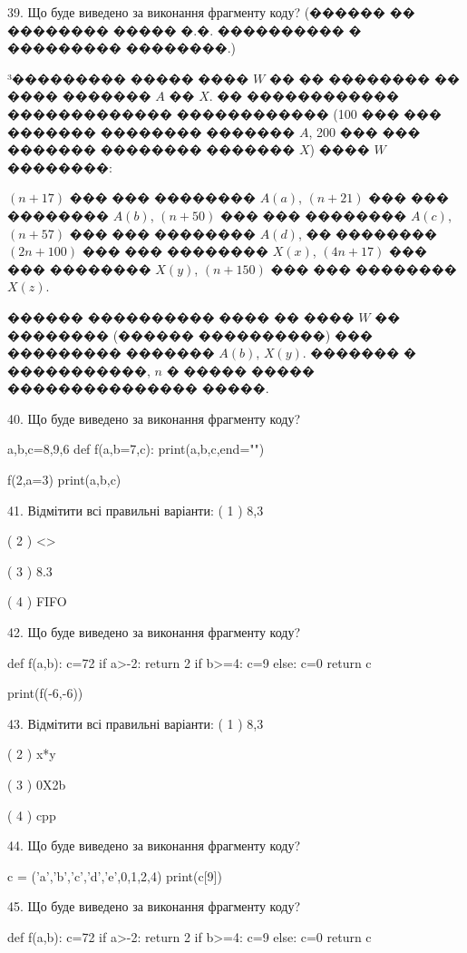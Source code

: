 \documentclass[11pt]{article}
\begin{document}

39. Що буде виведено за виконання фрагменту коду?
(������ �� �������� ����� �.�. ���������� � ��������� ��������.)\par {\hspace {0.5 cm}}³��������� ����� ���� $W$ �� �� �������� �� ���� ������� $A$ �� $X$. �� ������������ ������������� ������������ (100 ��� ��� ������� �������� ������� $A$,  200 ��� ��� ������� �������� ������� $X$) ���� $W$ ��������:\par {\hspace {0.5 cm}}$(n+17)$ ��� ��� �������� $A(a)$, $(n+21)$ ��� ��� �������� $A(b)$, $(n+50)$ ��� ��� �������� $A(c)$, $(n+57)$ ��� ��� �������� $A(d)$, �� �������� $(2n+100)$ ��� ��� �������� $X(x)$, $(4n+17)$ ��� ��� �������� $X(y)$, $(n+150)$ ��� ��� �������� $X(z)$.\par
{\hspace {0.5 cm}}������ ���������� ���� �� ���� $W$ �� �������� (������ ����������) ��� ��������� ������� $A(b)$, $X(y)$. ������� � �����������, $n$ � ����� ����� ��������������� �����.\par
40. Що буде виведено за виконання фрагменту коду?

a,b,c=8,9,6
def f(a,b=7,c):
    print(a,b,c,end="")

f(2,a=3)
print(a,b,c)


41. Відмітити всі правильні варіанти:
( 1 ) 8,3

( 2 ) <>

( 3 ) 8.3

( 4 ) FIFO

42. Що буде виведено за виконання фрагменту коду?

def f(a,b):
    c=72
    if a>-2:
        return 2
    if b>=4:
         c=9
    else: 
        c=0
    return c

print(f(-6,-6))

43. Відмітити всі правильні варіанти:
( 1 ) 8,3

( 2 ) x*y

( 3 ) 0X2b

( 4 ) cpp

44. Що буде виведено за виконання фрагменту коду?

c = ('a','b','c','d','e',0,1,2,4)
print(c[9])


45. Що буде виведено за виконання фрагменту коду?

def f(a,b):
    c=72
    if a>-2:
        return 2
    if b>=4:
         c=9
    else: 
        c=0
    return c
\end{document}
